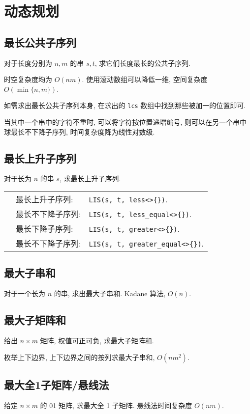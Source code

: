 \section{动态规划}
\subsection{最长公共子序列}
对于长度分别为 $n,m$ 的串 $s,t$, 求它们长度最长的公共子序列.

时空复杂度均为 $O(nm)$. 使用滚动数组可以降低一维, 空间复杂度 $O\left(\min\{n,m\}\right)$.



如需求出最长公共子序列本身, 在求出的 \lstinline{lcs} 数组中找到那些被加一的位置即可.

当其中一个串中的字符不重时, 可以将字符按位置递增编号, 则可以在另一个串中球最长不下降子序列, 时间复杂度降为线性对数级.

\subsection{最长上升子序列}
对于长为 $n$ 的串 $s$, 求最长上升子序列.



\begin{tabular}{@{}>{\textbullet}cll@{}}
  & 最长上升子序列:   & \lstinline|LIS(s, t, less<>{})|.          \\
  & 最长不下降子序列: & \lstinline|LIS(s, t, less_equal<>{})|.    \\
  & 最长下降子序列:   & \lstinline|LIS(s, t, greater<>{})|.       \\
  & 最长不下降子序列: & \lstinline|LIS(s, t, greater_equal<>{})|. \\
\end{tabular}

\subsection{最大子串和}
对于一个长为 $n$ 的串, 求出最大子串和. Kadane 算法, $O(n)$.



\subsection{最大子矩阵和}

给出 $n\times m$ 矩阵, 权值可正可负, 求最大子矩阵和.

枚举上下边界, 上下边界之间的按列求最大子串和, $O\left(nm^2\right)$.



\subsection{最大全1子矩阵/悬线法}

给定 $n\times m$ 的 01 矩阵, 求最大全 1 子矩阵. 悬线法时间复杂度 $O(nm)$.


